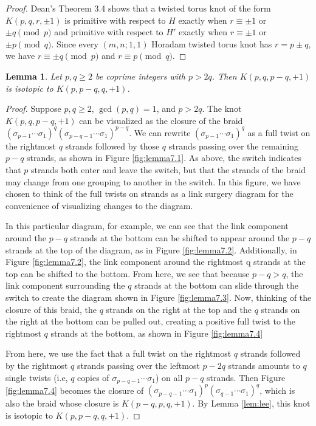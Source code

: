 \documentclass{amsart}
\newtheorem{lemma}{Lemma}
\begin{document}
\begin{proof}
Dean's Theorem 3.4 \cite{DeanSFSSurgeries} shows that a twisted torus knot of the form $K(p, q, r, \pm1)$ is primitive with respect to $H$ exactly when $r \equiv \pm 1$ or $\pm q \pmod p$ and primitive with respect to $H'$ exactly when $r \equiv \pm 1$ or $\pm p \pmod q$. Since every $(m,n;1,1)$ Horadam twisted torus knot has $r = p \pm q$, we have $r \equiv \pm q \pmod p$ and $r \equiv p \pmod q$. 
\end{proof}

\begin{lemma}\label{lem:positivesarethesame}
Let $p, q \ge 2$ be coprime integers with $p>2q$. Then $K(p,q,p-q,+1)$ is isotopic to $K(p, p-q, q, +1)$.
\end{lemma}

\begin{proof}
Suppose $p, q \ge 2$, $\gcd(p,q) = 1$, and $p >2q$. The knot $K(p,q,p-q,+1)$ can be visualized as the closure of the braid $(\sigma_{p-1} \cdots \sigma_1)^q (\sigma_{p-q-1} \cdots \sigma_1)^{p-q}$. We can rewrite $(\sigma_{p-1} \cdots \sigma_1)^q$ as a full twist on the rightmost $q$ strands followed by those $q$ strands passing over the remaining $p - q$ strands, as shown in Figure \ref{fig:lemma7.1}. As above, the switch indicates that $p$ strands both enter and leave the switch, but that the strands of the braid may change from one grouping to another in the switch. In this figure, we have chosen to think of the full twists on strands as a link surgery diagram for the convenience of visualizing changes to the diagram. 

In this particular diagram, for example, we can see that the link component around the $p-q$ strands at the bottom can be shifted to appear around the $p-q$ strands at the top of the diagram, as in Figure \ref{fig:lemma7.2}. Additionally, in Figure \ref{fig:lemma7.2}, the link component around the rightmost q strands at the top can be shifted to the bottom. From here, we see that because $p-q >q$, the link component surrounding the $q$ strands at the bottom can slide through the switch to create the diagram shown in Figure \ref{fig:lemma7.3}. Now, thinking of the closure of this braid, the $q$ strands on the right at the top and the $q$ strands on the right at the bottom can be pulled out, creating a positive full twist to the rightmost $q$ strands at the bottom, as shown in Figure \ref{fig:lemma7.4} 

From here, we use the fact that a full twist on the rightmost $q$ strands followed by the rightmost $q$ strands passing over the leftmost $p-2q$ strands amounts to $q$ single twists (i.e, $q$ copies of $\sigma_{p-q-1} \cdots \sigma_1$) on all $p-q$ strands. Then Figure \ref{fig:lemma7.4} becomes the closure of $(\sigma_{p-q-1} \cdots \sigma_1)^{p} (\sigma_{q-1} \cdots \sigma_1)^{q}$, which is also the braid whose closure is $K(p-q,p,q,+1)$. By Lemma \ref{lem:lee}, this knot is isotopic to $K(p, p-q, q, +1)$.
\end{proof}
\end{document}

